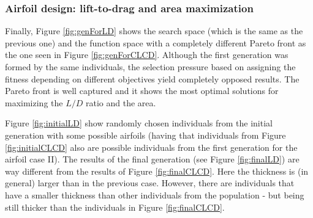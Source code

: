 \subsubsection*{Airfoil design: lift-to-drag and area maximization}

Finally, Figure \ref{fig:genForLD} shows the search space (which is the same as the previous one) and the function space with a completely different Pareto front as the one seen in Figure \ref{fig:genForCLCD}. Although the first generation was formed by the same individuals, the selection pressure based on assigning the fitness depending on different objectives yield completely opposed results. The Pareto front is well captured and it shows the most optimal solutions for maximizing the $L/D$ ratio and the area. 

Figure \ref{fig:initialLD} show randomly chosen individuals from the initial generation with some possible airfoils (having that individuals from Figure \ref{fig:initialCLCD} also are possible individuals from the first generation for the airfoil case II). The results of the final generation (see Figure \ref{fig:finalLD}) are way different from the results of Figure \ref{fig:finalCLCD}. Here the thickness is (in general) larger than in the previous case. However, there are individuals that have a smaller thickness than other individuals from the population - but being still thicker than the individuals in Figure \ref{fig:finalCLCD}.